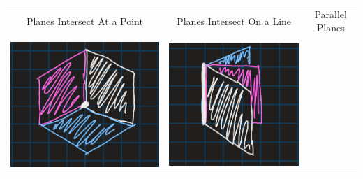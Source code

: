 \documentclass{article}
\begin{document}
\begin{tabular}{ c c c }
    \\
    Planes Intersect At a Point &
    Planes Intersect On a Line &
    Parallel Planes \\
    \\
    \includegraphics[scale=0.25]{Images/1.1.graph4.png} &
    \includegraphics[scale=0.25]{Images/1.1.graph5.png} &

\end{tabular}
\end{document}
